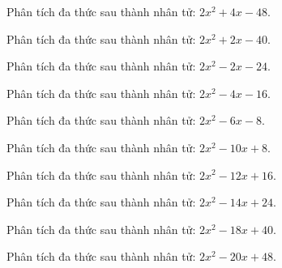 \begin{bt}
	Phân tích đa thức sau thành nhân tử: $2 x^2 + 4 x - 48$.
\end{bt}
\begin{bt}
	Phân tích đa thức sau thành nhân tử: $2 x^2 + 2 x - 40$.
\end{bt}
\begin{bt}
	Phân tích đa thức sau thành nhân tử: $2 x^2 - 2 x - 24$.
\end{bt}
\begin{bt}
	Phân tích đa thức sau thành nhân tử: $2 x^2 - 4 x - 16$.
\end{bt}
\begin{bt}
	Phân tích đa thức sau thành nhân tử: $2 x^2 - 6 x - 8$.
\end{bt}
\begin{bt}
	Phân tích đa thức sau thành nhân tử: $2 x^2 - 10 x + 8$.
\end{bt}
\begin{bt}
	Phân tích đa thức sau thành nhân tử: $2 x^2 - 12 x + 16$.
\end{bt}
\begin{bt}
	Phân tích đa thức sau thành nhân tử: $2 x^2 - 14 x + 24$.
\end{bt}
\begin{bt}
	Phân tích đa thức sau thành nhân tử: $2 x^2 - 18 x + 40$.
\end{bt}
\begin{bt}
	Phân tích đa thức sau thành nhân tử: $2 x^2 - 20 x + 48$.
\end{bt}
